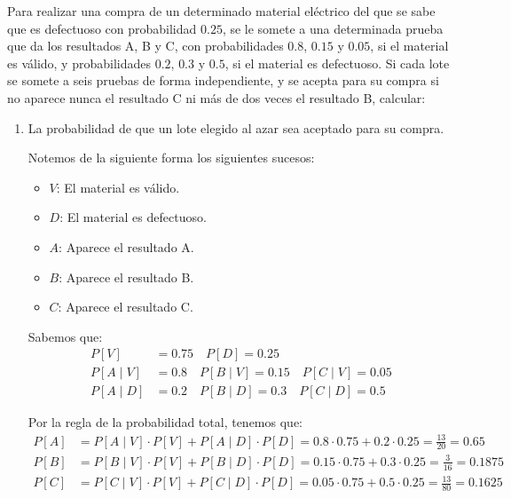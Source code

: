 \begin{ejercicio}
    Para realizar una compra de un determinado material eléctrico del que se sabe que es defectuoso con probabilidad $0.25$, se le somete a una determinada prueba que da los resultados A, B y C, con probabilidades $0.8$, $0.15$ y $0.05$, si el material es válido, y probabilidades $0.2$, $0.3$ y $0.5$, si el material es defectuoso. Si cada lote se somete a seis pruebas de forma independiente, y se acepta para su compra si no aparece nunca el resultado C ni más de dos veces el resultado B, calcular:
    \begin{enumerate}
        \item La probabilidad de que un lote elegido al azar sea aceptado para su compra.
        
        Notemos de la siguiente forma los siguientes sucesos:
        \begin{itemize}
            \item $V$: El material es válido.
            \item $D$: El material es defectuoso.
            \item $A$: Aparece el resultado A.
            \item $B$: Aparece el resultado B.
            \item $C$: Aparece el resultado C.
        \end{itemize}

        Sabemos que:
        \begin{align*}
            P[V] &= 0.75\quad
            P[D] = 0.25\\
            P[A\mid V] &= 0.8\quad
            P[B\mid V] = 0.15\quad
            P[C\mid V] = 0.05\\
            P[A\mid D] &= 0.2\quad
            P[B\mid D] = 0.3\quad
            P[C\mid D] = 0.5
        \end{align*}

        Por la regla de la probabilidad total, tenemos que:
        \begin{align*}
            P[A] &= P[A\mid V] \cdot P[V] + P[A\mid D] \cdot P[D] = 0.8 \cdot 0.75 + 0.2 \cdot 0.25 = \frac{13}{20} = 0.65\\
            P[B] &= P[B\mid V] \cdot P[V] + P[B\mid D] \cdot P[D] = 0.15 \cdot 0.75 + 0.3 \cdot 0.25 = \frac{3}{16} = 0.1875\\
            P[C] &= P[C\mid V] \cdot P[V] + P[C\mid D] \cdot P[D] = 0.05 \cdot 0.75 + 0.5 \cdot 0.25 = \frac{13}{80} = 0.1625
        \end{align*}


\end{enumerate}
\end{ejercicio}
